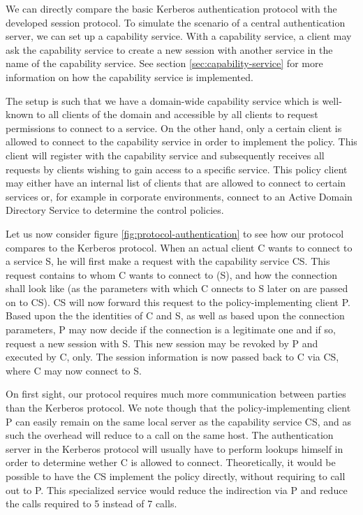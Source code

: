We can directly compare the basic Kerberos authentication protocol with the developed session protocol.
To simulate the scenario of a central authentication server, we can set up a capability service.
With a capability service, a client may ask the capability service to create a new session with another service in the name of the capability service.
See section \ref{sec:capability-service} for more information on how the capability service is implemented.

The setup is such that we have a domain-wide capability service which is well-known to all clients of the domain and accessible by all clients to request permissions to connect to a service.
On the other hand, only a certain client is allowed to connect to the capability service in order to implement the policy.
This client will register with the capability service and subsequently receives all requests by clients wishing to gain access to a specific service.
This policy client may either have an internal list of clients that are allowed to connect to certain services or, for example in corporate environments, connect to an Active Domain Directory Service to determine the control policies.

Let us now consider figure \ref{fig:protocol-authentication} to see how our protocol compares to the Kerberos protocol.
When an actual client C wants to connect to a service S, he will first make a request with the capability service CS.
This request contains to whom C wants to connect to (S), and how the connection shall look like (as the parameters with which C onnects to S later on are passed on to CS).
CS will now forward this request to the policy-implementing client P.
Based upon the the identities of C and S, as well as based upon the connection parameters, P may now decide if the connection is a legitimate one and if so, request a new session with S.
This new session may be revoked by P and executed by C, only.
The session information is now passed back to C via CS, where C may now connect to S.

On first sight, our protocol requires much more communication between parties than the Kerberos protocol.
We note though that the policy-implementing client P can easily remain on the same local server as the capability service CS, and as such the overhead will reduce to a call on the same host.
The authentication server in the Kerberos protocol will usually have to perform lookups himself in order to determine wether C is allowed to connect.
Theoretically, it would be possible to have the CS implement the policy directly, without requiring to call out to P.
This specialized service would reduce the indirection via P and reduce the calls required to 5 instead of 7 calls.

